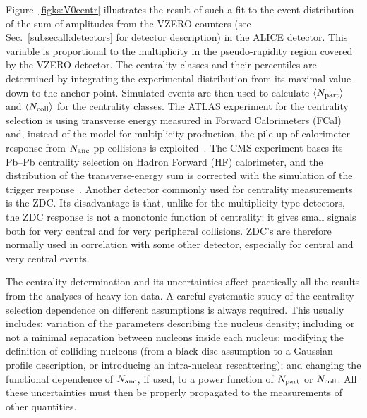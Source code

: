 Figure~\ref{figks:V0centr} illustrates the result of such a fit to the event distribution of the sum of amplitudes from the VZERO counters (see Sec.~\ref{subsecall:detectors} for detector description) in the ALICE detector. This variable is proportional to the multiplicity in the pseudo-rapidity region covered by the VZERO detector. The centrality classes and their percentiles are determined by integrating the experimental distribution from its maximal value down to the anchor point. Simulated events are then used to calculate $\langle N_{\rm part} \rangle$ and $\langle N_{\rm coll} \rangle$ for the centrality classes. The ATLAS experiment for the centrality selection is using transverse energy measured in Forward Calorimeters (FCal) and, instead of the model for multiplicity production, the pile-up of calorimeter response from $N_{\rm anc}$ pp collisions is exploited~\cite{ATLAS:2011ag}. The CMS experiment bases its Pb--Pb centrality selection on Hadron Forward (HF) calorimeter, and the distribution of the transverse-energy sum is corrected with the simulation of the trigger response~\cite{Chatrchyan:2011pb}. Another detector commonly used for centrality measurements is the ZDC. Its disadvantage is that, unlike for the multiplicity-type detectors, the ZDC response is not a monotonic function of centrality: it gives small signals both for very central and for very peripheral collisions. ZDC's are therefore normally used in correlation with some other detector, especially for central and very central events.

The centrality determination and its uncertainties affect practically all the results from the analyses of heavy-ion data. A careful systematic study of the centrality selection dependence on different assumptions is always required. This usually includes: variation of the parameters describing the nucleus density; including or not a minimal separation between nucleons inside each nucleus; modifying the definition of colliding nucleons (from a black-disc assumption to a Gaussian profile description, or introducing an intra-nuclear rescattering); and changing the functional dependence of $N_{\rm anc}$, if used, to a power function of $N_{\rm part}$ or $N_{\rm coll}$. All these uncertainties must then be properly propagated to the measurements of other quantities.

